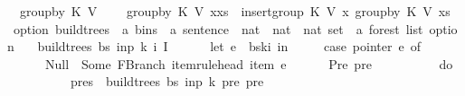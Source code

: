\begin{isabellebody}
\ \ {\isachardoublequoteopen}group{\isacharunderscore}{\kern0pt}by\ K\ V\ {\isacharbrackleft}{\kern0pt}{\isacharbrackright}{\kern0pt}\ {\isacharequal}{\kern0pt}\ {\isacharbrackleft}{\kern0pt}{\isacharbrackright}{\kern0pt}{\isachardoublequoteclose}\isanewline
{\isacharbar}{\kern0pt}\ {\isachardoublequoteopen}group{\isacharunderscore}{\kern0pt}by\ K\ V\ {\isacharparenleft}{\kern0pt}x{\isacharhash}{\kern0pt}xs{\isacharparenright}{\kern0pt}\ {\isacharequal}{\kern0pt}\ insert{\isacharunderscore}{\kern0pt}group\ K\ V\ x\ {\isacharparenleft}{\kern0pt}group{\isacharunderscore}{\kern0pt}by\ K\ V\ xs{\isacharparenright}{\kern0pt}{\isachardoublequoteclose}\isanewline
%
\isadelimproof
%
\endisadelimproof
%
\isatagproof
%
\endisatagproof
{\isafoldproof}%
%
\isadelimproof
\isanewline
%
\endisadelimproof
{}\isamarkupfalse%
\ {\isacharparenleft}{\kern0pt}option{\isacharparenright}{\kern0pt}\ build{\isacharunderscore}{\kern0pt}trees{\isacharprime}{\kern0pt}\ {\isacharcolon}{\kern0pt}{\isacharcolon}{\kern0pt}\ {\isachardoublequoteopen}{\isacharprime}{\kern0pt}a\ bins\ {\isasymRightarrow}\ {\isacharprime}{\kern0pt}a\ sentence\ {\isasymRightarrow}\ nat\ {\isasymRightarrow}\ nat\ {\isasymRightarrow}\ nat\ set\ {\isasymRightarrow}\ {\isacharprime}{\kern0pt}a\ forest\ list\ option{\isachardoublequoteclose}\ \isanewline
\ \ {\isachardoublequoteopen}build{\isacharunderscore}{\kern0pt}trees{\isacharprime}{\kern0pt}\ bs\ inp\ k\ i\ I\ {\isacharequal}{\kern0pt}\ {\isacharparenleft}{\kern0pt}\isanewline
\ \ \ \ let\ e\ {\isacharequal}{\kern0pt}\ bs{\isacharbang}{\kern0pt}k{\isacharbang}{\kern0pt}i\ in\ {\isacharparenleft}{\kern0pt}\isanewline
\ \ \ \ case\ pointer\ e\ of\isanewline
\ \ \ \ \ \ Null\ {\isasymRightarrow}\ Some\ {\isacharparenleft}{\kern0pt}{\isacharbrackleft}{\kern0pt}FBranch\ {\isacharparenleft}{\kern0pt}item{\isacharunderscore}{\kern0pt}rule{\isacharunderscore}{\kern0pt}head\ {\isacharparenleft}{\kern0pt}item\ e{\isacharparenright}{\kern0pt}{\isacharparenright}{\kern0pt}\ {\isacharbrackleft}{\kern0pt}{\isacharbrackright}{\kern0pt}{\isacharbrackright}{\kern0pt}{\isacharparenright}{\kern0pt}\isanewline
\ \ \ \ {\isacharbar}{\kern0pt}\ Pre\ pre\ {\isasymRightarrow}\ {\isacharparenleft}{\kern0pt}\isanewline
\ \ \ \ \ \ \ \ do\ {\isacharbraceleft}{\kern0pt}\isanewline
\ \ \ \ \ \ \ \ \ \ pres\ {\isasymleftarrow}\ build{\isacharunderscore}{\kern0pt}trees{\isacharprime}{\kern0pt}\ bs\ inp\ {\isacharparenleft}{\kern0pt}k{\isacharminus}{\kern0pt}{}{\isacharparenright}{\kern0pt}\ pre\ {\isacharbraceleft}{\kern0pt}pre{\isacharbraceright}{\kern0pt}{\isacharsemicolon}{\kern0pt}\isanewline

\end{isabellebody}
